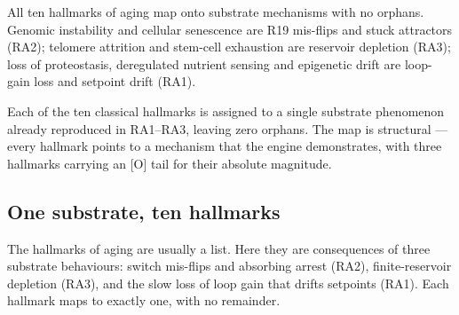 \documentclass[11pt]{article}
\begin{document}
\begin{answerbox}All ten hallmarks of aging map onto substrate mechanisms with no orphans. Genomic instability and cellular senescence are R19 mis-flips and stuck attractors (RA2); telomere attrition and stem-cell exhaustion are reservoir depletion (RA3); loss of proteostasis, deregulated nutrient sensing and epigenetic drift are loop-gain loss and setpoint drift (RA1).\end{answerbox}

\begin{abstractbox}Each of the ten classical hallmarks is assigned to a single substrate phenomenon already reproduced in RA1–RA3, leaving zero orphans. The map is structural — every hallmark points to a mechanism that the engine demonstrates, with three hallmarks carrying an [O] tail for their absolute magnitude.\end{abstractbox}

\subsection*{One substrate, ten hallmarks}

The hallmarks of aging are usually a list. Here they are consequences of three substrate behaviours: switch mis-flips and absorbing arrest (RA2), finite-reservoir depletion (RA3), and the slow loss of loop gain that drifts setpoints (RA1). Each hallmark maps to exactly one, with no remainder.
\end{document}
